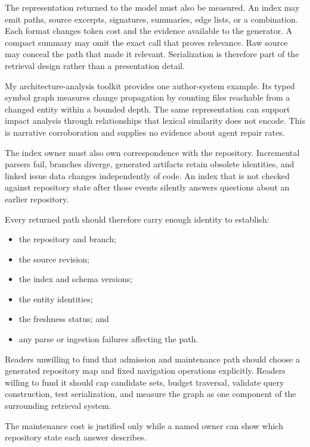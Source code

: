 The representation returned to the model must also be measured. An index may emit paths, source excerpts, signatures, summaries, edge lists, or a combination. Each format changes token cost and the evidence available to the generator. A compact summary may omit the exact call that proves relevance. Raw source may conceal the path that made it relevant. Serialization is therefore part of the retrieval design rather than a presentation detail.

My architecture-analysis toolkit provides one author-system example. Its typed symbol graph measures change propagation by counting files reachable from a changed entity within a bounded depth. The same representation can support impact analysis through relationships that lexical similarity does not encode. This is narrative corroboration and supplies no evidence about agent repair rates.

The index owner must also own correspondence with the repository. Incremental parsers fail, branches diverge, generated artifacts retain obsolete identities, and linked issue data changes independently of code. An index that is not checked against repository state after those events silently answers questions about an earlier repository.


Every returned path should therefore carry enough identity to establish:

\begin{itemize}
\tightlist
\item
  the repository and branch;
\item
  the source revision;
\item
  the index and schema versions;
\item
  the entity identities;
\item
  the freshness status; and
\item
  any parse or ingestion failures affecting the path.
\end{itemize}

Readers unwilling to fund that admission and maintenance path should choose a generated repository map and fixed navigation operations explicitly. Readers willing to fund it should cap candidate sets, budget traversal, validate query construction, test serialization, and measure the graph as one component of the surrounding retrieval system.

The maintenance cost is justified only while a named owner can show which repository state each answer describes.

